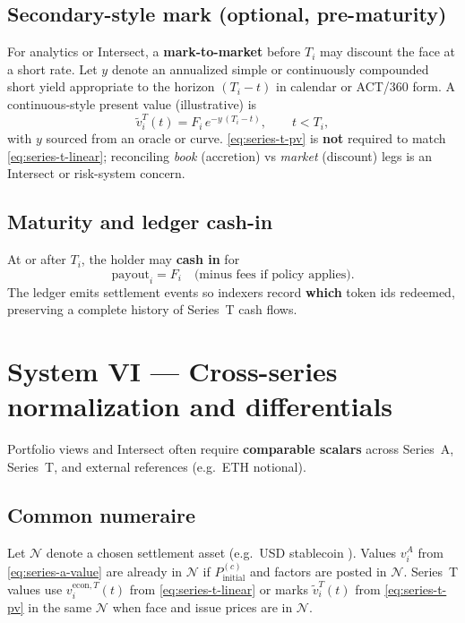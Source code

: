 \documentclass[11pt,a4paper]{article}
\newcommand{\minor}{\text{minor units}}
\begin{document}
\subsection{Secondary-style mark (optional, pre-maturity)}

For analytics or Intersect, a \textbf{mark-to-market} before $T_i$ may discount the face at a short rate. Let $y$ denote an annualized simple or continuously compounded short yield appropriate to the horizon $(T_i - t)$ in calendar or ACT/360 form. A continuous-style present value (illustrative) is
\begin{equation}
\label{eq:series-t-pv}
\tilde{v}_i^{T}(t) = F_i\, e^{-y\,(T_i - t)},
\qquad t < T_i,
\end{equation}
with $y$ sourced from an oracle or curve. \eqref{eq:series-t-pv} is \textbf{not} required to match \eqref{eq:series-t-linear}; reconciling \emph{book} (accretion) vs \emph{market} (discount) legs is an Intersect or risk-system concern.

\subsection{Maturity and ledger cash-in}

At or after $T_i$, the holder may \textbf{cash in} for
\begin{equation}
\label{eq:series-t-maturity}
\mathrm{payout}_i = F_i \quad \text{(minus fees if policy applies).}
\end{equation}
The ledger emits settlement events so indexers record \textbf{which} token ids redeemed, preserving a complete history of Series~T cash flows.

\section{System VI --- Cross-series normalization and differentials}
\label{sec:cross-series}

Portfolio views and Intersect often require \textbf{comparable scalars} across Series~A, Series~T, and external references (e.g.\ ETH notional).

\subsection{Common numeraire}

Let $\mathcal{N}$ denote a chosen settlement asset (e.g.\ USD stablecoin \minor). Values $v_i^{A}$ from \eqref{eq:series-a-value} are already in $\mathcal{N}$ if $P^{(c)}_{\mathrm{initial}}$ and factors are posted in $\mathcal{N}$. Series~T values use $v_i^{\mathrm{econ},T}(t)$ from \eqref{eq:series-t-linear} or marks $\tilde{v}_i^{T}(t)$ from \eqref{eq:series-t-pv} in the same $\mathcal{N}$ when face and issue prices are in $\mathcal{N}$.
\end{document}
